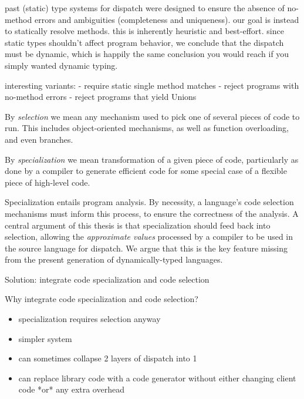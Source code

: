 past (static) type systems for dispatch were designed to ensure the absence of
no-method errors and ambiguities (completeness and uniqueness). our goal
is instead to statically resolve methods. this is inherently heuristic and
best-effort. since static types shouldn't affect program behavior, we
conclude that the dispatch must be dynamic, which is happily the same
conclusion you would reach if you simply wanted dynamic typing.


interesting variants:
- require static single method matches
- reject programs with no-method errors
- reject programs that yield Unions


By \emph{selection} we mean any mechanism used to pick one of several
pieces of code to run. This includes object-oriented mechanisms, as well
as function overloading, and even branches.

By \emph{specialization} we mean transformation of a given piece of code,
particularly as done by a compiler to generate efficient code for some
special case of a flexible piece of high-level code.

Specialization entails program analysis. By necessity, a language's
code selection mechanisms must inform this process, to ensure the
correctness of the analysis. A central argument of this thesis is that
specialization should feed back into selection, allowing the
\emph{approximate values} processed by a compiler to be used in the
source language for dispatch. We argue that this is the key feature
missing from the present generation of dynamically-typed languages.

Solution: integrate code specialization and code selection

Why integrate code specialization and code selection?

\begin{itemize}
\item specialization requires selection anyway
\item simpler system
\item can sometimes collapse 2 layers of dispatch into 1
\item can replace library code with a code generator without either changing
  client code *or* any extra overhead
\end{itemize}

